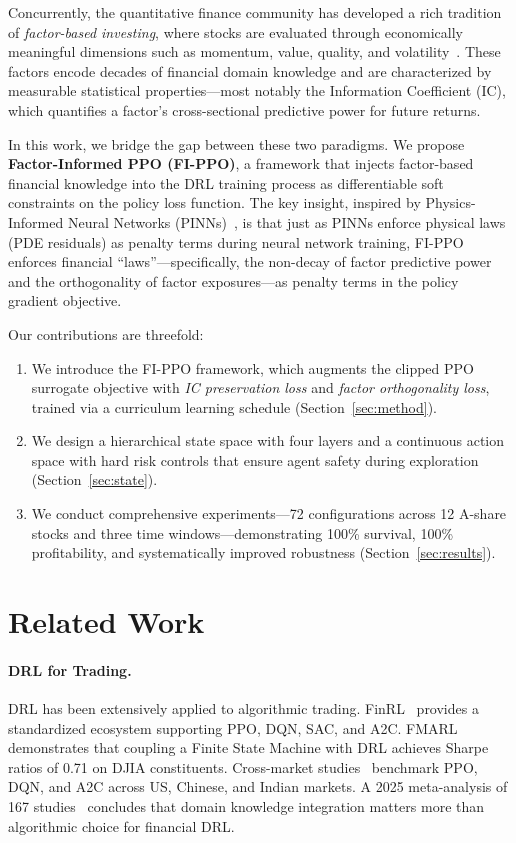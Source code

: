 \documentclass[11pt,a4paper]{article}
\begin{document}
Concurrently, the quantitative finance community has developed a rich tradition of \emph{factor-based investing}, where stocks are evaluated through economically meaningful dimensions such as momentum, value, quality, and volatility~\cite{fama2015,hxz2015}. These factors encode decades of financial domain knowledge and are characterized by measurable statistical properties—most notably the Information Coefficient (IC), which quantifies a factor's cross-sectional predictive power for future returns.

In this work, we bridge the gap between these two paradigms. We propose \textbf{Factor-Informed PPO (FI-PPO)}, a framework that injects factor-based financial knowledge into the DRL training process as differentiable soft constraints on the policy loss function. The key insight, inspired by Physics-Informed Neural Networks (PINNs)~\cite{raissi2019}, is that just as PINNs enforce physical laws (PDE residuals) as penalty terms during neural network training, FI-PPO enforces financial ``laws''---specifically, the non-decay of factor predictive power and the orthogonality of factor exposures---as penalty terms in the policy gradient objective.

Our contributions are threefold:
\begin{enumerate}[itemsep=0pt]
    \item We introduce the FI-PPO framework, which augments the clipped PPO surrogate objective with \emph{IC preservation loss} and \emph{factor orthogonality loss}, trained via a curriculum learning schedule (Section~\ref{sec:method}).
    \item We design a hierarchical state space with four layers and a continuous action space with hard risk controls that ensure agent safety during exploration (Section~\ref{sec:state}).
    \item We conduct comprehensive experiments---72 configurations across 12 A-share stocks and three time windows---demonstrating 100\% survival, 100\% profitability, and systematically improved robustness (Section~\ref{sec:results}).
\end{enumerate}

\section{Related Work}
\label{sec:related}

\paragraph{DRL for Trading.}
DRL has been extensively applied to algorithmic trading. FinRL~\cite{finrl2024} provides a standardized ecosystem supporting PPO, DQN, SAC, and A2C. FMARL~\cite{fmarl2025} demonstrates that coupling a Finite State Machine with DRL achieves Sharpe ratios of 0.71 on DJIA constituents. Cross-market studies~\cite{zou2024,wang2026} benchmark PPO, DQN, and A2C across US, Chinese, and Indian markets. A 2025 meta-analysis of 167 studies~\cite{aireview2025} concludes that domain knowledge integration matters more than algorithmic choice for financial DRL.
\end{document}
